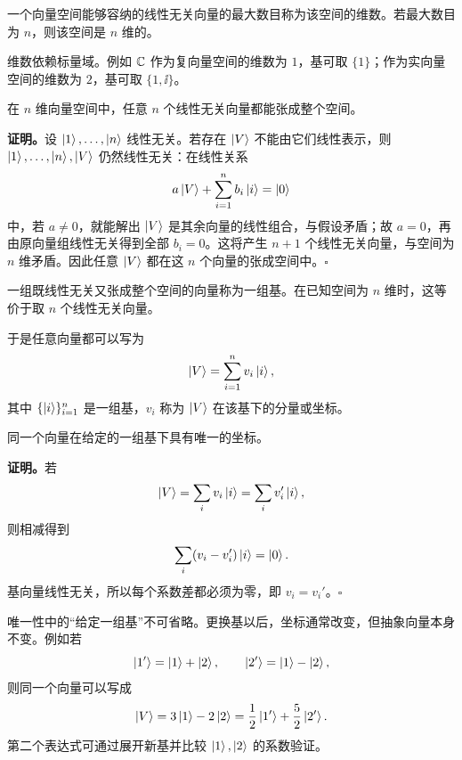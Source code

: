 
\begin{definition}
一个向量空间能够容纳的线性无关向量的最大数目称为该空间的维数。若最大数目为 $n$，则该空间是 $n$ 维的。
\end{definition}

维数依赖标量域。例如 $\mathbb{C}$ 作为复向量空间的维数为 $1$，基可取 $\{1\}$；作为实向量空间的维数为 $2$，基可取 $\{1,\ii\}$。

\begin{theorem}
在 $n$ 维向量空间中，任意 $n$ 个线性无关向量都能张成整个空间。
\end{theorem}

\textbf{证明。}设 $\left|1\right\rangle,\ldots,\left|n\right\rangle$ 线性无关。若存在 $\left|V\right\rangle$ 不能由它们线性表示，则 $\left|1\right\rangle,\ldots,\left|n\right\rangle,\left|V\right\rangle$ 仍然线性无关：在线性关系
\[
  a\left|V\right\rangle+\sum_{i=1}^{n}b_i\left|i\right\rangle=\left|0\right\rangle
\]
中，若 $a\neq0$，就能解出 $\left|V\right\rangle$ 是其余向量的线性组合，与假设矛盾；故 $a=0$，再由原向量组线性无关得到全部 $b_i=0$。这将产生 $n+1$ 个线性无关向量，与空间为 $n$ 维矛盾。因此任意 $\left|V\right\rangle$ 都在这 $n$ 个向量的张成空间中。\hfill$\square$

\begin{definition}
一组既线性无关又张成整个空间的向量称为一组基。在已知空间为 $n$ 维时，这等价于取 $n$ 个线性无关向量。
\end{definition}

于是任意向量都可以写为
\begin{equation}
  \left|V\right\rangle=\sum_{i=1}^{n}v_i\left|i\right\rangle,
  \label{eq:QM-C01-S01-basis-expansion}
\end{equation}
其中 $\{\left|i\right\rangle\}_{i=1}^{n}$ 是一组基，$v_i$ 称为 $\left|V\right\rangle$ 在该基下的分量或坐标。


\begin{theorem}
同一个向量在给定的一组基下具有唯一的坐标。
\end{theorem}

\textbf{证明。}若
\[
  \left|V\right\rangle=\sum_i v_i\left|i\right\rangle=\sum_i v_i'\left|i\right\rangle,
\]
则相减得到
\[
  \sum_i(v_i-v_i')\left|i\right\rangle=\left|0\right\rangle.
\]
基向量线性无关，所以每个系数差都必须为零，即 $v_i=v_i'$。\hfill$\square$

唯一性中的“给定一组基”不可省略。更换基以后，坐标通常改变，但抽象向量本身不变。例如若
\[
  \left|1'\right\rangle=\left|1\right\rangle+\left|2\right\rangle,\qquad
  \left|2'\right\rangle=\left|1\right\rangle-\left|2\right\rangle,
\]
则同一个向量可以写成
\[
  \left|V\right\rangle=3\left|1\right\rangle-2\left|2\right\rangle
  =\frac{1}{2}\left|1'\right\rangle+\frac{5}{2}\left|2'\right\rangle.
\]
第二个表达式可通过展开新基并比较 $\left|1\right\rangle,\left|2\right\rangle$ 的系数验证。


